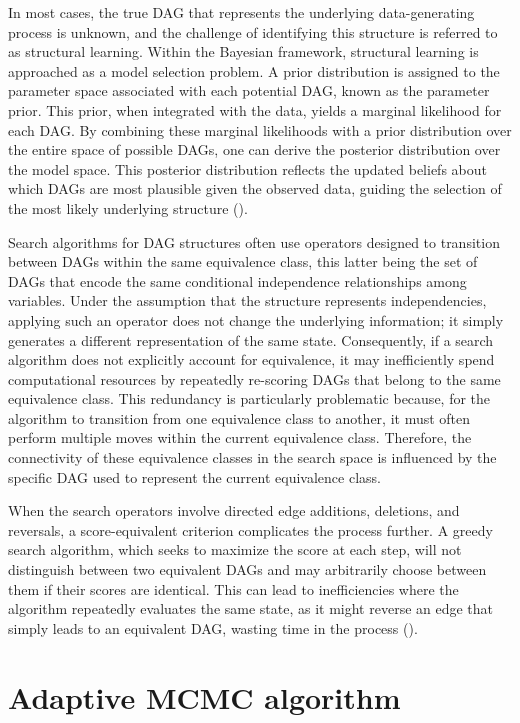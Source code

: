 \documentclass{report}
\begin{document}
In most cases, the true DAG that represents the underlying data-generating process is unknown, and the challenge of identifying this structure is referred to as structural learning. Within the Bayesian framework, structural learning is approached as a model selection problem. A prior distribution is assigned to the parameter space associated with each potential DAG, known as the parameter prior. This prior, when integrated with the data, yields a marginal likelihood for each DAG. By combining these marginal likelihoods with a prior distribution over the entire space of possible DAGs, one can derive the posterior distribution over the model space. This posterior distribution reflects the updated beliefs about which DAGs are most plausible given the observed data, guiding the selection of the most likely underlying structure  (\citet{peluso2020compatible}).

Search algorithms for DAG structures often use operators designed to transition between DAGs within the same equivalence class, this latter being the set of DAGs that encode the same conditional independence relationships among variables. Under the assumption that the structure represents independencies, applying such an operator does not change the underlying information; it simply generates a different representation of the same state. Consequently, if a search algorithm does not explicitly account for equivalence, it may inefficiently spend computational resources by repeatedly re-scoring DAGs that belong to the same equivalence class. This redundancy is particularly problematic because, for the algorithm to transition from one equivalence class to another, it must often perform multiple moves within the current equivalence class. Therefore, the connectivity of these equivalence classes in the search space is influenced by the specific DAG used to represent the current equivalence class.

When the search operators involve directed edge additions, deletions, and reversals, a score-equivalent criterion complicates the process further. A greedy search algorithm, which seeks to maximize the score at each step, will not distinguish between two equivalent DAGs and may arbitrarily choose between them if their scores are identical. This can lead to inefficiencies where the algorithm repeatedly evaluates the same state, as it might reverse an edge that simply leads to an equivalent DAG, wasting time in the process (\citet{chickering2002learning}).

\section{Adaptive MCMC algorithm}
\end{document}
